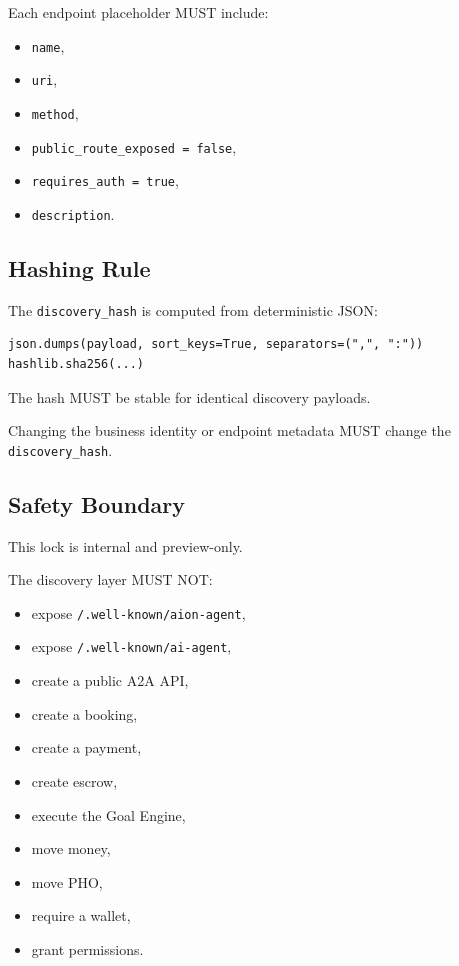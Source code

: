 Each endpoint placeholder MUST include:

\begin{itemize}
  \item \texttt{name},
  \item \texttt{uri},
  \item \texttt{method},
  \item \texttt{public\_route\_exposed = false},
  \item \texttt{requires\_auth = true},
  \item \texttt{description}.
\end{itemize}

\subsection{Hashing Rule}

The \texttt{discovery\_hash} is computed from deterministic JSON:

\begin{verbatim}
json.dumps(payload, sort_keys=True, separators=(",", ":"))
hashlib.sha256(...)
\end{verbatim}

The hash MUST be stable for identical discovery payloads.

Changing the business identity or endpoint metadata MUST change the \texttt{discovery\_hash}.

\subsection{Safety Boundary}

This lock is internal and preview-only.

The discovery layer MUST NOT:

\begin{itemize}
  \item expose \texttt{/.well-known/aion-agent},
  \item expose \texttt{/.well-known/ai-agent},
  \item create a public A2A API,
  \item create a booking,
  \item create a payment,
  \item create escrow,
  \item execute the Goal Engine,
  \item move money,
  \item move PHO,
  \item require a wallet,
  \item grant permissions.
\end{itemize}

